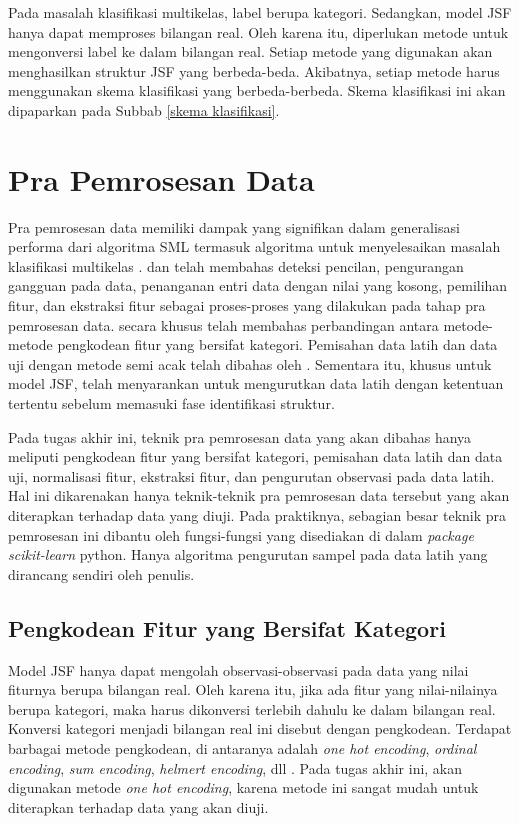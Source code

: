 \noindent Pada masalah klasifikasi multikelas, label berupa kategori. Sedangkan, model JSF hanya dapat memproses bilangan real. Oleh karena itu, diperlukan metode untuk mengonversi label ke dalam bilangan real. Setiap metode yang digunakan akan menghasilkan struktur JSF yang berbeda-beda. Akibatnya, setiap metode harus menggunakan skema klasifikasi yang berbeda-berbeda. Skema klasifikasi ini akan dipaparkan pada Subbab \ref{skema klasifikasi}.

\section{Pra Pemrosesan Data} \label{preproccessing}
\noindent Pra pemrosesan data memiliki dampak yang signifikan dalam generalisasi performa dari algoritma SML termasuk algoritma untuk menyelesaikan masalah klasifikasi multikelas \cite{kotsiantis,alexandropoulos}.  dan  telah membahas deteksi pencilan, pengurangan gangguan pada data, penanganan entri data dengan nilai yang kosong, pemilihan fitur, dan ekstraksi fitur sebagai proses-proses yang dilakukan pada tahap pra pemrosesan data.  secara khusus telah membahas perbandingan antara metode-metode pengkodean fitur yang bersifat kategori. Pemisahan data latih dan data uji dengan metode semi acak telah dibahas oleh . Sementara itu, khusus untuk model JSF,  telah menyarankan untuk mengurutkan data latih dengan ketentuan tertentu sebelum memasuki fase identifikasi struktur.

\noindent Pada tugas akhir ini, teknik pra pemrosesan data yang akan dibahas hanya meliputi pengkodean fitur yang bersifat kategori, pemisahan data latih dan data uji, normalisasi fitur, ekstraksi fitur, dan pengurutan observasi pada data latih. Hal ini dikarenakan hanya teknik-teknik pra pemrosesan data tersebut yang akan diterapkan terhadap data yang diuji. Pada praktiknya, sebagian besar teknik pra pemrosesan ini dibantu oleh fungsi-fungsi yang disediakan di dalam \emph{package scikit-learn} python. Hanya algoritma pengurutan sampel pada data latih yang dirancang sendiri oleh penulis.

\subsection{Pengkodean Fitur yang Bersifat Kategori} \label{pengkodean}
\noindent Model JSF hanya dapat mengolah observasi-observasi pada data yang nilai fiturnya berupa bilangan real. Oleh karena itu, jika ada fitur yang nilai-nilainya berupa kategori, maka harus dikonversi terlebih dahulu ke dalam bilangan real. Konversi kategori menjadi bilangan real ini disebut dengan pengkodean. Terdapat barbagai metode pengkodean, di antaranya adalah \emph{one hot encoding}, \emph{ordinal encoding}, \emph{sum encoding}, \emph{helmert encoding}, dll \cite{kedarpotdar}. Pada tugas akhir ini, akan digunakan metode \emph{one hot encoding}, karena metode ini sangat mudah untuk diterapkan terhadap data yang akan diuji.


